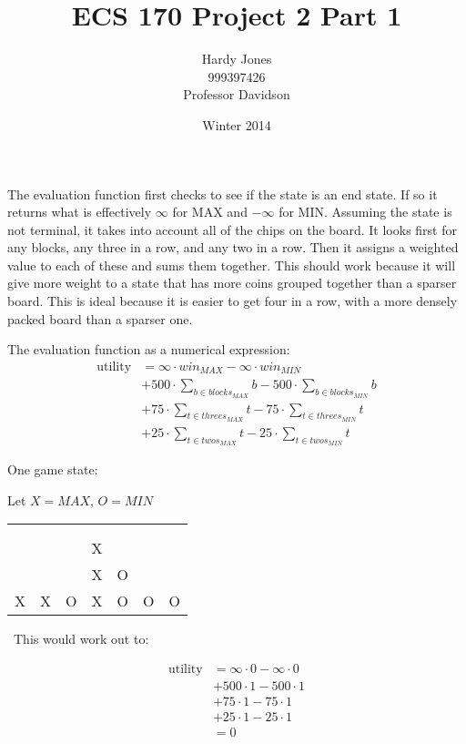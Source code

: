 \documentclass[12pt,letterpaper]{article}
\title{ECS 170 Project 2 Part 1\vspace{-2ex}}
\author{Hardy Jones\\
        999397426\\
        Professor Davidson\vspace{-2ex}}
\date{Winter 2014}
\begin{document}
  \maketitle




  The evaluation function first checks to see if the state is an end state. If so it returns what is effectively $\infty$ for MAX and $-\infty$ for MIN.
  Assuming the state is not terminal, it takes into account all of the chips on the board.
  It looks first for any blocks, any three in a row, and any two in a row.
  Then it assigns a weighted value to each of these and sums them together.
  This should work because it will give more weight to a state that has more coins grouped together than a sparser board.
  This is ideal because it is easier to get four in a row, with a more densely packed board than a sparser one.

  The evaluation function as a numerical expression:
  \begin{align*}
    \text{utility} &= \infty \cdot win_{MAX} - \infty \cdot win_{MIN} \\
    &+ 500 \cdot \sum_{b \in blocks_{MAX}}b - 500 \cdot \sum_{b \in blocks_{MIN}}b \\
    &+ 75 \cdot \sum_{t \in threes_{MAX}}t - 75 \cdot \sum_{t \in threes_{MIN}}t \\
    &+ 25 \cdot \sum_{t \in twos_{MAX}}t - 25 \cdot \sum_{t \in twos_{MIN}}t
  \end{align*}

  One game state:

  Let $X = MAX$, $O = MIN$

  \begin{tabular}{| c | c | c | c | c | c | c |}
   \hline
   &  &  &  &  &  & \\
   \hline
   &  &  &  &  &  & \\
   \hline
   &  &  &  &  &  & \\
   \hline
   &  &  & X &  &  & \\
   \hline
   &  &  & X & O &  & \\
   \hline
   X & X & O & X & O & O & O \\
   \hline
  \end{tabular}

  \
  This would work out to:

  \begin{align*}
    \text{utility} &= \infty \cdot 0 - \infty \cdot 0 \\
    &+ 500 \cdot 1 - 500 \cdot 1 \\
    &+ 75 \cdot 1 - 75 \cdot 1 \\
    &+ 25 \cdot 1 - 25 \cdot 1 \\
    &= 0
  \end{align*}
\end{document}
